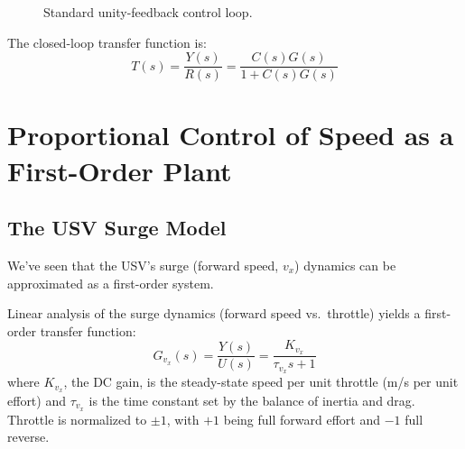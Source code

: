 \documentclass[12pt]{article}
\begin{document}
\begin{figure}[htbp]
\centering
{}
\caption{Standard unity-feedback control loop.}
\label{fig:unity_feedback}
\end{figure}

The closed-loop transfer function is:
\begin{equation}
  T(s) = \frac{Y(s)}{R(s)} = \frac{C(s)G(s)}{1 + C(s)G(s)}
  \label{eq:cltf}
\end{equation}

\section{Proportional Control of Speed as a First-Order Plant}
\label{sec:pcontrol}

\subsection{The USV Surge Model}

We've seen that the USV's surge (forward speed, $v_x$) dynamics can be approximated as a first-order system.

Linear analysis of the surge dynamics (forward speed vs.\ throttle) yields a
first-order transfer function:
\begin{equation}
  G_{v_x}(s) = \frac{Y(s)}{U(s)} = \frac{K_{v_x}}{\tau_{v_x} s + 1}
  \label{eq:surge_plant}
\end{equation}
where $K_{v_x}$, the DC gain, is the steady-state speed per unit throttle (m/s per unit effort)
and $\tau_{v_x}$ is the time constant set by the balance of inertia and drag.
Throttle is normalized to $\pm 1$, with $+1$ being full forward effort and
$-1$ full reverse.
\end{document}
